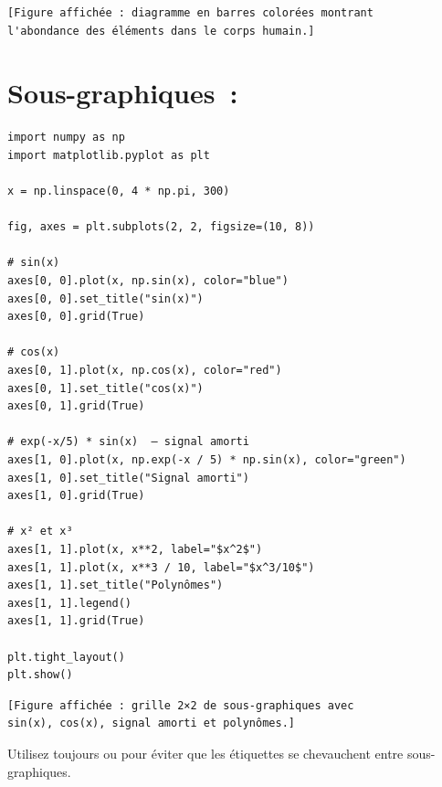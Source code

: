 \begin{codeoutput}
\begin{verbatim}
[Figure affichée : diagramme en barres colorées montrant
l'abondance des éléments dans le corps humain.]
\end{verbatim}
\end{codeoutput}

\section{Sous-graphiques~: }

\begin{codeblock}[title=\textbf{Python}]
\begin{verbatim}
import numpy as np
import matplotlib.pyplot as plt

x = np.linspace(0, 4 * np.pi, 300)

fig, axes = plt.subplots(2, 2, figsize=(10, 8))

# sin(x)
axes[0, 0].plot(x, np.sin(x), color="blue")
axes[0, 0].set_title("sin(x)")
axes[0, 0].grid(True)

# cos(x)
axes[0, 1].plot(x, np.cos(x), color="red")
axes[0, 1].set_title("cos(x)")
axes[0, 1].grid(True)

# exp(-x/5) * sin(x)  — signal amorti
axes[1, 0].plot(x, np.exp(-x / 5) * np.sin(x), color="green")
axes[1, 0].set_title("Signal amorti")
axes[1, 0].grid(True)

# x² et x³
axes[1, 1].plot(x, x**2, label="$x^2$")
axes[1, 1].plot(x, x**3 / 10, label="$x^3/10$")
axes[1, 1].set_title("Polynômes")
axes[1, 1].legend()
axes[1, 1].grid(True)

plt.tight_layout()
plt.show()
\end{verbatim}
\end{codeblock}

\begin{codeoutput}
\begin{verbatim}
[Figure affichée : grille 2×2 de sous-graphiques avec
sin(x), cos(x), signal amorti et polynômes.]
\end{verbatim}
\end{codeoutput}

\begin{bonnepratique}
Utilisez toujours  ou  pour \'eviter
que les \'etiquettes se chevauchent entre sous-graphiques.
\end{bonnepratique}

